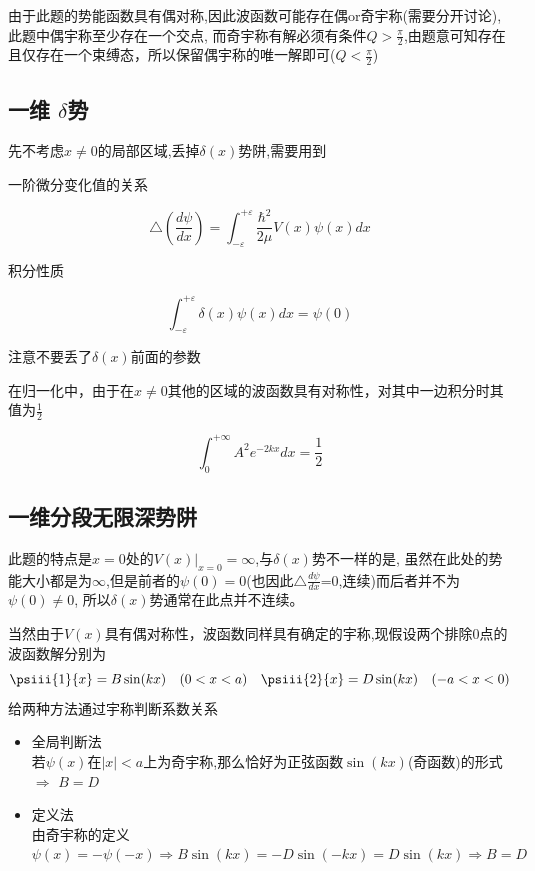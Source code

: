 
            
        
        由于此题的势能函数具有偶对称,因此波函数可能存在偶or奇宇称(需要分开讨论),此题中偶宇称至少存在一个交点,
        而奇宇称有解必须有条件$Q>\frac{\pi}{2}$,由题意可知存在且仅存在一个束缚态，所以保留偶宇称的唯一解即可($Q<\frac{\pi}{2}$)
        
        \subsection{一维 \texorpdfstring{$\delta$}{}势}   %
        
        先不考虑$x\neq0$的局部区域,丢掉$\delta(x)$势阱,需要用到  
        \begin{formal}
            
            \indent 一阶微分变化值的关系  

            $$ \triangle(\frac{d\psi}{dx}) = \int_{-\varepsilon}^{+\varepsilon}\frac{\hbar^2}{2\mu}V(x)\psi(x)dx $$     %

            积分性质

            $$\int_{-\varepsilon}^{+\varepsilon} \delta(x) \psi(x) dx =\psi(0) $$

        \end{formal}
        
        
        注意不要丢了$\delta(x)$前面的参数
        
        
        在归一化中，由于在$x\neq 0$其他的区域的波函数具有对称性，对其中一边积分时其值为$\frac{1}{2}$
        
        $$ \int_{0}^{+\infty}A^2 e^{-2kx} dx = \frac{1}{2} $$
        
        
    \subsection{一维分段无限深势阱}
        此题的特点是$x=0$处的$V(x)|_{x=0}=\infty$,与$\delta(x)$势不一样的是,
        虽然在此处的势能大小都是为$\infty$,但是前者的$\psi(0)=0$(也因此$\triangle \frac{d\psi}{dx}$=0,连续)而后者并不为$\psi(0)\neq0$,
        所以$\delta(x)$势通常在此点并不连续。

        当然由于$V(x)$具有偶对称性，波函数同样具有确定的宇称,现假设两个排除0点的波函数解分别为
        $$\psiii{1}{x}=B\sin(kx) \quad (0<x<a) \quad \psiii{2}{x}=D\sin(kx) \quad (-a<x<0)$$
        给两种方法通过宇称判断系数关系
        \begin{itemize}
            \item 全局判断法   \\
                若$\psi(x)$在$|x|<a$上为奇宇称,那么恰好为正弦函数$\sin(kx)$(奇函数)的形式 $\Rightarrow$ $B = D$ 
            \item 定义法    \\
                由奇宇称的定义$\psi(x)=-\psi(-x) \Rightarrow B\sin(kx)=-D\sin(-kx)=D\sin(kx) \Rightarrow B=D$ 
        \end{itemize}
        
